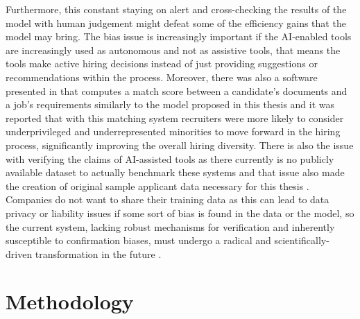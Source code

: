 \documentclass[draft,final]{thesisclass} %
\begin{document}
Furthermore, this constant staying on alert and cross-checking the results of the model with human judgement might defeat some of the efficiency gains that the model may bring.
The bias issue is increasingly important if the \acs{AI}-enabled tools are increasingly used as autonomous and not as assistive tools, that means the tools make active hiring decisions instead of just providing suggestions or recommendations within the process.
Moreover, there was also a software presented in \textcite[10-11]{bias_ai_hiring} that computes a match score between a candidate's documents and a job's requirements similarly to the model proposed in this thesis and it was reported that with this matching system recruiters were more likely to consider underprivileged and underrepresented minorities to move forward in the hiring process, significantly improving the overall hiring diversity.
There is also the issue with verifying the claims of \acs{AI}-assisted tools as there currently is no publicly available dataset to actually benchmark these systems and that issue also made the creation of original sample applicant data necessary for this thesis \parencite[11]{bias_ai_hiring}.
Companies do not want to share their training data as this can lead to data privacy or liability issues if some sort of bias is found in the data or the model, so the current system, lacking robust mechanisms for verification and inherently susceptible to confirmation biases, must undergo a radical and scientifically-driven transformation in the future \parencite[11]{bias_ai_hiring}.

\chapter{Methodology} \label{methodology}
\end{document}
